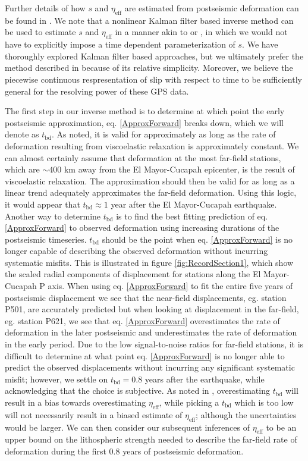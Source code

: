\documentclass[1p]{elsarticle}
\begin{document}
Further details of how $s$ and $\eta_\mathrm{eff}$ are estimated from postseismic deformation can be found in \citet{Hines2015}.  We note that a nonlinear Kalman filter based inverse method can be used to estimate $s$ and $\eta_{\mathrm{eff}}$ in a manner akin to \citet{Segall1997} or \citet{McGuire2003}, in which we would not have to explicitly impose a time dependent parameterization of $s$. We have thoroughly explored Kalman filter based approaches, but we ultimately prefer the method described in \citet{Hines2015} because of its relative simplicity. Moreover, we believe the piecewise continuous respresentation of slip with respect to time to be sufficiently general for the resolving power of these GPS data.

The first step in our inverse method is to determine at which point the early postseismic approximation, eq. \ref{ApproxForward} breaks down, which we will denote as $t_{\mathrm{bd}}$.  As noted, it is valid for approximately as long as the rate of deformation resulting from viscoelastic relaxation is approximately constant. We can almost certainly assume that deformation at the most far-field stations, which are $\sim400$ km away from the El Mayor-Cucapah epicenter, is the result of viscoelastic relaxation. The approximation should then be valid for as long as a linear trend adequately approximates the far-field deformation. Using this logic, it would appear that $t_{\mathrm{bd}}\approx1$ year after the El Mayor-Cucapah earthquake.  Another way to determine $t_{\mathrm{bd}}$ is to find the best fitting prediction of eq. \ref{ApproxForward} to observed deformation using increasing durations of the postseismic timeseries.  $t_\mathrm{bd}$ should be the point when eq. \ref{ApproxForward} is no longer capable of describing the observed deformation without incurring systematic misfits.  This is illustrated in figure \ref{fig:RecordSection1}, which show the scaled radial components of displacement for stations along the El Mayor-Cucapah P axis.  When using eq. \ref{ApproxForward} to fit the entire five years of postseismic displacement we see that the near-field displacements, eg. station P501, are accurately predicted but when looking at displacement in the far-field, eg. station P621, we see that eq. \ref{ApproxForward} overestimates the rate of deformation in the later postseismic and underestimates the rate of deformation in the early period.  Due to the low signal-to-noise ratios for far-field stations, it is difficult to determine at what point eq. \ref{ApproxForward} is no longer able to predict the observed displacements without incurring any significant systematic misfit; however, we settle on $t_{\mathrm{bd}}=0.8$ years after the earthquake, while acknowledging that the choice is subjective. As noted in \cite{Hines2015}, overestimating $t_{\mathrm{bd}}$ will result in a bias towards overestimating $\eta_{\mathrm{eff}}$, while picking a $t_\mathrm{bd}$ which is too low will not necessarily result in a biased estimate of $\eta_\mathrm{eff}$; although the uncertainties would be larger. We can then consider our subsequent inferences of $\eta_{\mathrm{eff}}$ to be an upper bound on the lithospheric strength needed to describe the far-field rate of deformation during the first 0.8 years of postseismic deformation. 
\end{document}
